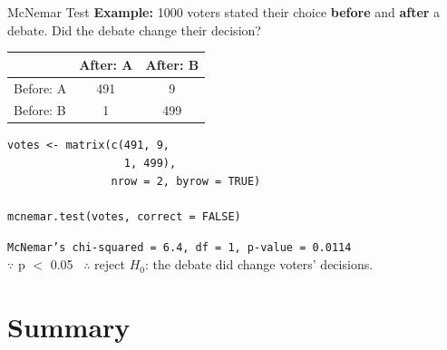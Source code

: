 \documentclass{beamer}					%
\begin{document}
 
\begin{frame}[fragile]{McNemar Test}
\small
\textbf{Example:} 1000 voters stated their choice \textbf{before} and
\textbf{after} a debate. Did the debate change their decision?
 
\vspace{0.4em}
\centering
\begin{tabular}{lcc}
\toprule
 & After: A & After: B \\
\midrule
Before: A & 491 & 9 \\
Before: B & 1 & 499 \\
\bottomrule
\end{tabular}
 
\flushleft
\vspace{0.5em}
\begin{lstlisting}
votes <- matrix(c(491, 9,
                  1, 499),
                nrow = 2, byrow = TRUE)
 
mcnemar.test(votes, correct = FALSE)
\end{lstlisting}
 
\vspace{0.3em}
\texttt{McNemar's chi-squared = 6.4, df = 1, p-value = 0.0114}\\
\vspace{0.3em}
$\because$ p $<$ 0.05 \ $\therefore$ reject $H_0$: the debate did change voters' decisions.
 
\end{frame}
 
\section{Summary}
 
\end{document}
